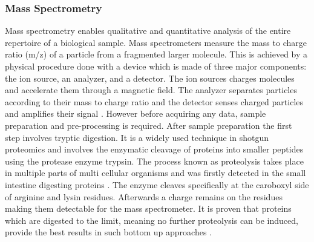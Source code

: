 \documentclass[
  11pt,
]{article}
\begin{document}
\hypertarget{mass-spectrometry}{%
\subsubsection{Mass Spectrometry}\label{mass-spectrometry}}

Mass spectrometry enables qualitative and quantitative analysis of the
entire repertoire of a biological sample. Mass spectrometers measure the
mass to charge ratio (m/z) of a particle from a fragmented larger
molecule. This is achieved by a physical procedure done with a device
which is made of three major components: the ion source, an analyzer,
and a detector. The ion sources charges molecules and accelerate them
through a magnetic field. The analyzer separates particles according to
their mass to charge ratio and the detector senses charged particles and
amplifies their signal \citep{Parker2010}. However before acquiring any
data, sample preparation and pre-processing is required. After sample
preparation the first step involves tryptic digestion. It is a widely
used technique in shotgun proteomics and involves the enzymatic cleavage
of proteins into smaller peptides using the protease enzyme trypsin. The
process known as proteolysis takes place in multiple parts of multi
cellular organisms and was firstly detected in the small intestine
digesting proteins \citep{Wang2008}. The enzyme cleaves specifically at
the caroboxyl side of arginine and lysin residues. Afterwards a charge
remains on the residues making them detectable for the mass
spectrometer. It is proven that proteins which are digested to the
limit, meaning no further proteolysis can be induced, provide the best
results in such bottom up approaches \citep{Brownridge2011, Laskay2013}.
\end{document}
